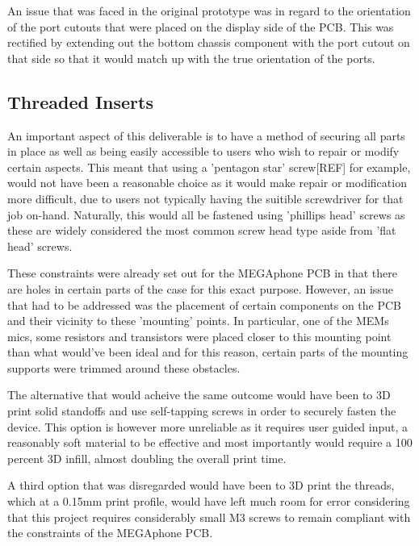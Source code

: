 An issue that was faced in the original prototype was in regard to the orientation of the port cutouts that were placed on the display side of the PCB.
This was rectified by extending out the bottom chassis component with the port cutout on that side so that it would match up with the true orientation of the ports. %

\subsection{Threaded Inserts}

An important aspect of this deliverable is to have a method of securing all parts in place as well as being easily accessible to users who wish to repair or modify certain aspects.
This meant that using a 'pentagon star' screw[REF] for example, would not have been a reasonable choice as it would make repair or modification more difficult, due to users not typically having the suitible screwdriver for that job on-hand.
Naturally, this would all be fastened using 'phillips head' screws as these are widely considered the most common screw head type aside from 'flat head' screws.

These constraints were already set out for the MEGAphone PCB in that there are holes in certain parts of the case for this exact purpose.
However, an issue that had to be addressed was the placement of certain components on the PCB and their vicinity to these 'mounting' points.
In particular, one of the MEMs mics, some resistors and transistors were placed closer to this mounting point than what would've been ideal and for this reason, certain parts of the mounting supports were trimmed around these obstacles.

The alternative that would acheive the same outcome would have been to 3D print solid standoffs and use self-tapping screws in order to securely fasten the device.
This option is however more unreliable as it requires user guided input, a reasonably soft material to be effective and most importantly would require a 100 percent 3D infill, almost doubling the overall print time.

A third option that was disregarded would have been to 3D print the threads, which at a 0.15mm print profile, would have left much room for error considering that this project requires considerably small M3 screws to remain compliant with the constraints of the MEGAphone PCB.

